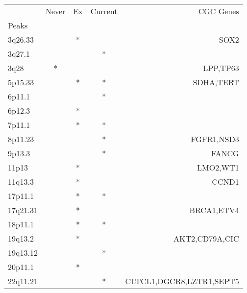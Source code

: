 \begin{tabular}{lcccr}
\toprule
{} & Never & Ex & Current &                 CGC Genes \\
Peaks    &       &    &         &                           \\
\midrule
3q26.33  &       &  * &         &                      SOX2 \\
3q27.1   &       &    &       * &                           \\
3q28     &     * &    &         &                  LPP,TP63 \\
5p15.33  &       &  * &       * &                 SDHA,TERT \\
6p11.1   &       &    &       * &                           \\
6p12.3   &       &  * &         &                           \\
7p11.1   &       &  * &       * &                           \\
8p11.23  &       &    &       * &                FGFR1,NSD3 \\
9p13.3   &       &    &       * &                     FANCG \\
11p13    &       &  * &         &                  LMO2,WT1 \\
11q13.3  &       &  * &         &                     CCND1 \\
17p11.1  &       &  * &       * &                           \\
17q21.31 &       &  * &         &                BRCA1,ETV4 \\
18p11.1  &       &  * &       * &                           \\
19q13.2  &       &  * &         &            AKT2,CD79A,CIC \\
19q13.12 &       &    &       * &                           \\
20p11.1  &       &  * &         &                           \\
22q11.21 &       &    &       * &  CLTCL1,DGCR8,LZTR1,SEPT5 \\
\bottomrule
\end{tabular}
